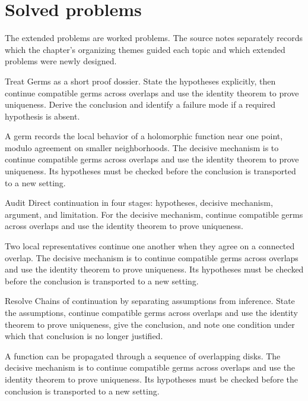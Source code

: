 \section{Solved problems}
The extended problems are worked problems. The source notes separately records which the chapter's organizing themes guided each topic and which extended problems were newly designed.

\begin{problem}\label{prob:iv15-problem-01}
Treat Germs as a short proof dossier. State the hypotheses explicitly, then continue compatible germs across overlaps and use the identity theorem to prove uniqueness. Derive the conclusion and identify a failure mode if a required hypothesis is absent.
\end{problem}
\begin{solution}
A germ records the local behavior of a holomorphic function near one point, modulo agreement on smaller neighborhoods. The decisive mechanism is to continue compatible germs across overlaps and use the identity theorem to prove uniqueness. Its hypotheses must be checked before the conclusion is transported to a new setting.
\end{solution}

\begin{problem}\label{prob:iv15-problem-02}
Audit Direct continuation in four stages: hypotheses, decisive mechanism, argument, and limitation. For the decisive mechanism, continue compatible germs across overlaps and use the identity theorem to prove uniqueness.
\end{problem}
\begin{solution}
Two local representatives continue one another when they agree on a connected overlap. The decisive mechanism is to continue compatible germs across overlaps and use the identity theorem to prove uniqueness. Its hypotheses must be checked before the conclusion is transported to a new setting.
\end{solution}

\begin{problem}\label{prob:iv15-problem-03}
Resolve Chains of continuation by separating assumptions from inference. State the assumptions, continue compatible germs across overlaps and use the identity theorem to prove uniqueness, give the conclusion, and note one condition under which that conclusion is no longer justified.
\end{problem}
\begin{solution}
A function can be propagated through a sequence of overlapping disks. The decisive mechanism is to continue compatible germs across overlaps and use the identity theorem to prove uniqueness. Its hypotheses must be checked before the conclusion is transported to a new setting.
\end{solution}

